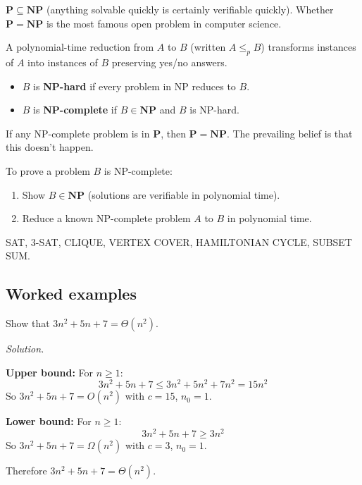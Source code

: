 $\mathbf{P} \subseteq \mathbf{NP}$ (anything solvable quickly is certainly verifiable quickly). Whether $\mathbf{P} = \mathbf{NP}$ is the most famous open problem in computer science.

\begin{definition}
A polynomial-time reduction from $A$ to $B$ (written $A \leq_p B$) transforms instances of $A$ into instances of $B$ preserving yes/no answers.
\begin{itemize}
  \item $B$ is \textbf{NP-hard} if every problem in NP reduces to $B$.
  \item $B$ is \textbf{NP-complete} if $B \in \mathbf{NP}$ and $B$ is NP-hard.
\end{itemize}
\end{definition}

If any NP-complete problem is in $\mathbf{P}$, then $\mathbf{P} = \mathbf{NP}$. The prevailing belief is that this doesn't happen.

\begin{strategy}
To prove a problem $B$ is NP-complete:
\begin{enumerate}
  \item Show $B \in \mathbf{NP}$ (solutions are verifiable in polynomial time).
  \item Reduce a known NP-complete problem $A$ to $B$ in polynomial time.
\end{enumerate}
\end{strategy}

\begin{example}
SAT, 3-SAT, CLIQUE, VERTEX COVER, HAMILTONIAN CYCLE, SUBSET SUM.
\end{example}

\subsection*{Worked examples}

\begin{example}
Show that $3n^2 + 5n + 7 = \Theta(n^2)$.

\emph{Solution.}

\textbf{Upper bound:} For $n \geq 1$:
\[
3n^2 + 5n + 7 \leq 3n^2 + 5n^2 + 7n^2 = 15n^2
\]
So $3n^2 + 5n + 7 = O(n^2)$ with $c = 15$, $n_0 = 1$.

\textbf{Lower bound:} For $n \geq 1$:
\[
3n^2 + 5n + 7 \geq 3n^2
\]
So $3n^2 + 5n + 7 = \Omega(n^2)$ with $c = 3$, $n_0 = 1$.

Therefore $3n^2 + 5n + 7 = \Theta(n^2)$.
\end{example}

